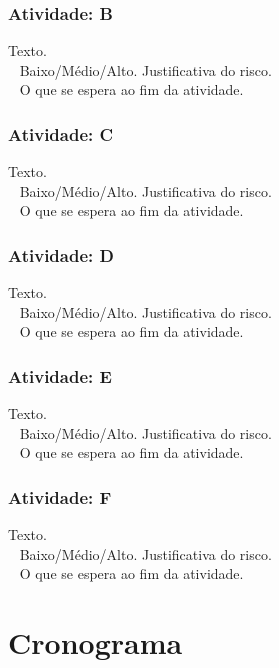 \documentclass{article}
\begin{document}
\subsubsection*{Atividade: B} 
 Texto.
\\\
 Baixo/Médio/Alto. Justificativa do risco.
\\\
 O que se espera ao fim da atividade.

\subsubsection*{Atividade: C} 
 Texto.
\\\
 Baixo/Médio/Alto. Justificativa do risco.
\\\
 O que se espera ao fim da atividade.

\subsubsection*{Atividade: D} 
 Texto.
\\\
 Baixo/Médio/Alto. Justificativa do risco.
\\\
 O que se espera ao fim da atividade.

\subsubsection*{Atividade: E} 
 Texto.
\\\
 Baixo/Médio/Alto. Justificativa do risco.
\\\
 O que se espera ao fim da atividade.

\subsubsection*{Atividade: F} 
\text{\bf{Descrição:}} Texto.
\\\
\text{\bf{Risco:}} Baixo/Médio/Alto. Justificativa do risco.
\\\
 O que se espera ao fim da atividade.

\section{Cronograma}
\end{document}
